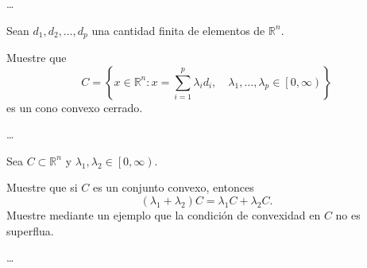 \documentclass{testfcuni} %
\begin{document}
\begin{questions}

  \begin{solution}
    \ldots
  \end{solution}

  \question

  Sean $d_{1},d_{2},\ldots,d_{p}$ una cantidad finita de elementos
  de $\mathds{R}^{n}$.

  Muestre que
  \[
    C=
    \left\{
    x\in\mathds{R}^{n}\colon
    x=
    \sum_{i=1}^{p}
    \lambda_{i}d_{i},\quad
    \lambda_{1},\ldots,\lambda_{p}\in
    \left[0,\infty\right)
    \right\}
  \]
  es un cono convexo cerrado.

  \begin{solution}
    \ldots
  \end{solution}

  \question
  Sea $C\subset\mathds{R}^{n}$ y $\lambda_{1},\lambda_{2}\in\left[0,\infty\right)$.

  Muestre que si $C$ es un conjunto convexo, entonces
  \[
    \left(
    \lambda_{1}+
    \lambda_{2}
    \right)
    C=
    \lambda_{1}C+
    \lambda_{2}C.
  \]
  Muestre mediante un ejemplo que la condición de convexidad en $C$ no es superflua.

  \begin{solution}
    \ldots
  \end{solution}


\end{questions}
\end{document}
